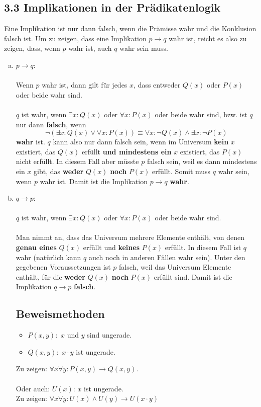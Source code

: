 \documentclass[12pt,a4paper]{article}
\begin{document}
\subsection*{3.3 Implikationen in der Prädikatenlogik}
Eine Implikation ist nur dann falsch, wenn die Prämisse wahr und die Konklusion falsch ist. Um zu zeigen, dass eine Implikation $p \rightarrow q$ wahr ist, reicht es also zu zeigen, dass, wenn $p$ wahr ist, auch $q$ wahr sein muss.
\begin{enumerate}[a)]
\item $p \rightarrow q$:\\
\\
Wenn $p$ wahr ist, dann gilt für jedes $x$, dass entweder $Q(x)$ oder $P(x)$ oder beide wahr sind.\\
\\
$q$ ist wahr, wenn $\exists x: Q(x)$ oder $\forall x: P(x)$ oder beide wahr sind, bzw. ist $q$ nur dann \textbf{falsch}, wenn $$\neg (\exists x:Q(x) \lor \forall x: P(x)) \equiv \forall x: \neg Q(x) \land \exists x: \neg P(x)$$ \textbf{wahr} ist. $q$ kann also nur dann falsch sein, wenn im Universum \textbf{kein} $x$ existiert, das $Q(x)$ erfüllt \textbf{und mindestens ein}  $x$ existiert, das $P(x)$ nicht erfüllt. In diesem Fall aber müsste $p$ falsch sein, weil es dann mindestens ein $x$ gibt, das \textbf{weder} $Q(x)$ \textbf{noch} $P(x)$ erfüllt. Somit muss $q$ wahr sein, wenn $p$ wahr ist. Damit ist die Implikation $p \rightarrow q$ \textbf{wahr}.
\item $q \rightarrow p$:\\
\\
$q$ ist wahr, wenn $\exists x: Q(x)$ oder $\forall x: P(x)$ oder beide wahr sind.\\
\\
Man nimmt an, dass das Universum mehrere Elemente enthält, von denen \textbf{genau eines} $Q(x)$ erfüllt und \textbf{keines} $P(x)$ erfüllt. In diesem Fall ist $q$ wahr (natürlich kann $q$ auch noch in anderen Fällen wahr sein). Unter den gegebenen Voraussetzungen ist $p$ falsch, weil das Universum Elemente enthält, für die \textbf{weder} $Q(x)$ \textbf{noch} $P(x)$ erfüllt sind. Damit ist die Implikation $q\rightarrow p$ \textbf{falsch}.

\subsection*{Beweismethoden}
\begin{itemize}
\item $P(x,y):$ $x$ und $y$ sind ungerade.
\item$Q(x,y):$ $x\cdot y$ ist ungerade.
\end{itemize}
Zu zeigen: $\forall x \forall y: P(x,y) \rightarrow Q(x,y)$.\\
\\
Oder auch: $U(x)$: $x$ ist ungerade.\\
Zu zeigen: $\forall x \forall y: U(x) \land U(y) \rightarrow U(x\cdot y)$

\end{enumerate}
\end{document}
